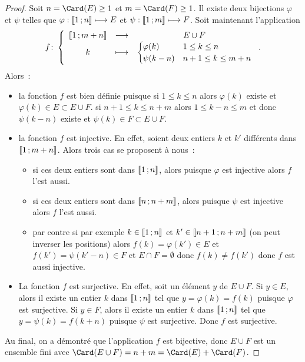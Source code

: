 \begin{proof}
  Soit $n=\Card(E)\geq 1$ et $m=\Card(F)\geq 1$. Il existe deux bijections $\varphi$ et $\psi$ telles que $\varphi:\mathopen{\llbracket}1\mathclose{}\mathpunct{};n\mathclose{\rrbracket} \longmapsto E$ et $\psi:\mathopen{\llbracket}1\mathclose{}\mathpunct{};m\mathclose{\rrbracket} \longmapsto F$. Soit maintenant l'application
  \begin{equation}
    f\colon \left\{\begin{array}{ccc} \mathopen{\llbracket}1\mathclose{}\mathpunct{};m+n\mathclose{\rrbracket} & \longrightarrow &E\cup F\\ k & \longmapsto & \begin{cases} \varphi(k) & 1\leq k\leq n \\ \psi(k-n) & n+1\leq k\leq m+n\end{cases} \end{array} \right..
  \end{equation}
  Alors~:
    \begin{itemize}
    \item la fonction $f$ est bien définie puisque si $1\leq k \leq n$ alors $\varphi(k)$ existe et $\varphi(k)\in E\subset E\cup F$. si $n+1\leq k \leq n+m$ alors $1\leq k-n \leq m$ et donc $\psi(k-n)$ existe et $\psi(k)\in F\subset E\cup F$.
    \item la fonction $f$ est injective. En effet, soient deux entiers $k$ et $k'$ différents  dans $\mathopen{\llbracket}1\mathclose{}\mathpunct{};m+n\mathclose{\rrbracket}$. Alors trois cas se proposent à nous~:
      \begin{itemize}
      \item si ces deux entiers sont dans $\mathopen{\llbracket}1\mathclose{}\mathpunct{};n\mathclose{\rrbracket}$, alors puisque $\varphi$ est injective alors $f$ l'est aussi.
      \item si ces deux entiers sont dans $\mathopen{\llbracket}n\mathclose{}\mathpunct{};n+m\mathclose{\rrbracket}$, alors puisque $\psi$ est injective alors $f$ l'est aussi.
      \item par contre si par exemple $k\in\mathopen{\llbracket}1\mathclose{}\mathpunct{};n\mathclose{\rrbracket}$ et $k'\in\mathopen{\llbracket}n+1\mathclose{}\mathpunct{};n+m\mathclose{\rrbracket}$ (on peut inverser les positions) alors $f(k)=\varphi(k')\in E$ et $f(k')=\psi(k'-n)\in F$ et $E\cap F = \emptyset$ donc $f(k)\neq f(k')$ donc $f$ est aussi injective.
      \end{itemize}
    \item La fonction $f$ est surjective. En effet, soit un élément $y$ de $E\cup F$. Si $y\in E$, alors il existe un entier $k$ dans $\mathopen{\llbracket}1\mathclose{}\mathpunct{};n\mathclose{\rrbracket}$ tel que $y=\varphi(k)=f(k)$ puisque $\varphi$ est surjective. Si $y\in F$, alors il existe un entier $k$ dans $\mathopen{\llbracket}1\mathclose{}\mathpunct{};n\mathclose{\rrbracket}$ tel que $y=\psi(k)=f(k+n)$ puisque $\psi$ est surjective. Donc $f$ est surjective.
    \end{itemize}
    Au final, on a démontré que l'application $f$ est bijective, donc $E\cup F$ est un ensemble fini avec $\Card(E\cup F)=n+m=\Card(E)+\Card(F)$.
  \end{proof}
